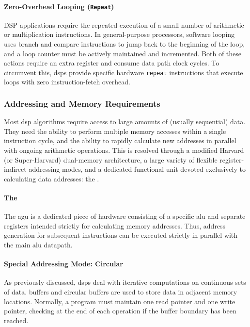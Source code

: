 \paragraph{Zero-Overhead Looping (\texttt{Repeat})} 
DSP applications require the repeated execution of a small number of arithmetic or multiplication instructions. In general-purpose processors, software looping uses branch and compare instructions to jump back to the beginning of the loop, and a loop counter must be actively maintained and incremented. Both of these actions require an extra register and consume data path clock cycles. To circumvent this, \glspl{dsp} provide specific hardware \texttt{repeat} instructions that execute loops with zero instruction-fetch overhead.

\subsubsection{Addressing and Memory Requirements} 
Most \gls{dsp} algorithms require access to large amounts of (usually sequential) data. They need the ability to perform multiple memory accesses within a single instruction cycle, and the ability to rapidly calculate new addresses in parallel with ongoing arithmetic operations. This is resolved through a modified Harvard (or Super-Harvard) dual-memory architecture, a large variety of flexible register-indirect addressing modes, and a dedicated functional unit devoted exclusively to calculating data addresses: the .

\paragraph{The }
The \gls{agu} is a dedicated piece of hardware consisting of a specific \gls{alu} and separate registers intended strictly for calculating memory addresses. Thus, address generation for subsequent instructions can be executed strictly in parallel with the main \gls{alu} datapath.


\paragraph{Special Addressing Mode: Circular}
As previously discussed, \glspl{dsp} deal with iterative computations on continuous sets of data.  buffers and circular buffers are used to store data in adjacent memory locations. Normally, a program must maintain one read pointer and one write pointer, checking at the end of each operation if the buffer boundary has been reached.

